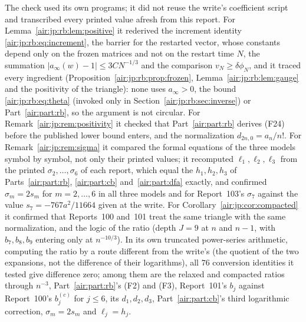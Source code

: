 \documentclass[11pt,letterpaper]{article}
\numberwithin{equation}{section}
\theoremstyle{remark}
\begin{document}
The check used its own programs; it did not reuse the write's coefficient script and transcribed every printed value afresh from this report. For Lemma~\ref{air:jp:rb:lem:positive} it rederived the increment identity \eqref{air:jp:rb:eq:increment}, the barrier for the restarted vector, whose constants depend only on the frozen matrices and not on the restart time $N$, the summation $|a_\infty(w)-1|\le3CN^{-1/3}$ and the comparison $v_N\ge\delta\phi_N$, and it traced every ingredient (Proposition~\ref{air:jp:rb:prop:frozen}, Lemma~\ref{air:jp:rb:lem:gauge} and the positivity of the triangle): none uses $a_\infty>0$, the bound \eqref{air:jp:rb:eq:theta} (invoked only in Section~\ref{air:jp:rb:sec:inverse}) or Part~\ref{air:part:rb}, so the argument is not circular. For Remark~\ref{air:jp:rem:positivity} it checked that Part~\ref{air:part:rb} derives (F24) before the published lower bound enters, and the normalization $d_{2n,0}=a_n/n!$. For Remark~\ref{air:jp:rem:sigma} it compared the formal equations of the three models symbol by symbol, not only their printed values; it recomputed $\ell_1,\ell_2,\ell_3$ from the printed $\sigma_2,\ldots,\sigma_6$ of each report, which equal the $h_1,h_2,h_3$ of Parts~\ref{air:part:rb}, \ref{air:part:cb} and~\ref{air:part:dfa} exactly, and confirmed $\sigma_m=2s_m$ for $m=2,\ldots,6$ in all three models and for Report~103's $\sigma_7$ against the value $s_7=-767a^2/11664$ given at the write. For Corollary~\ref{air:jp:cor:compacted} it confirmed that Reports~100 and~101 treat the same triangle with the same normalization, and the logic of the ratio (depth $J=9$ at $n$ and $n-1$, with $b_7,b_8,b_9$ entering only at $n^{-10/3}$). In its own truncated power-series arithmetic, computing the ratio by a route different from the write's (the quotient of the two expansions, not the difference of their logarithms), all $76$ conversion identities it tested give difference zero; among them are the relaxed and compacted ratios through $n^{-3}$, Part~\ref{air:part:rb}'s (F2) and (F3), Report~101's $b_j$ against Report~100's $b^{(c)}_j$ for $j\le6$, its $d_1,d_2,d_3$, Part~\ref{air:part:cb}'s third logarithmic correction, $\sigma_m=2s_m$ and $\ell_j=h_j$.
\end{document}
